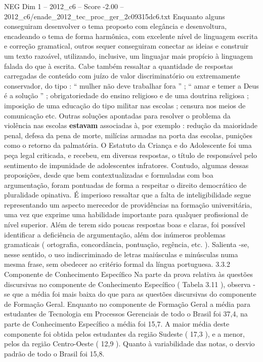 \begin{textsample}{NEG Dim 1 – 2012\_c6 – Score -2.00 – 2012\_c6/enade\_2012\_tec\_proc\_ger\_2c09315dc6.txt}
Enquanto alguns conseguiram desenvolver o tema proposto com elegância e desenvoltura, encadeando o tema de forma harmônica, com excelente nível de linguagem escrita e correção gramatical, outros sequer conseguiram conectar as ideias e construir um texto razoável, utilizando, inclusive, um linguajar mais propício à linguagem falada do que à escrita.
Cabe também ressaltar a quantidade de respostas carregadas de conteúdo com juízo de valor discriminatório ou extremamente conservador, do tipo : “ mulher não deve trabalhar fora ” ; “ amar e temer a Deus é a solução ” ; obrigatoriedade do ensino religioso e de uma doutrina religiosa ; imposição de uma educação do tipo militar nas escolas ; censura nos meios de comunicação etc.
Outras soluções apontadas para resolver o problema da violência nas escolas \textbf{estavam} associadas à, por exemplo : redução da maioridade penal, defesa da pena de morte, milícias armadas na porta das escolas, punições como o retorno da palmatória.
O Estatuto da Criança e do Adolescente foi uma peça legal criticada, e recebeu, em diversas respostas, o título de responsável pelo sentimento de impunidade de adolescentes infratores.
Contudo, algumas dessas proposições, desde que bem contextualizadas e formuladas com boa argumentação, foram pontuadas de forma a respeitar o direito democrático de pluralidade opinativa.
É imperioso ressaltar que a falta de inteligibilidade segue representando um aspecto merecedor de providências na formação universitária, uma vez que exprime uma habilidade importante para qualquer profissional de nível superior.
Além de terem sido poucas respostas boas e claras, foi possível identificar a deficiência de argumentação, além dos inúmeros problemas gramaticais ( ortografia, concordância, pontuação, regência, etc. ).
Salienta -se, nesse sentido, o uso indiscriminado de letras maiúsculas e minúsculas numa mesma frase, sem obedecer ao critério formal da língua portuguesa. 3.3.2 Componente de Conhecimento Específico Na parte da prova relativa às questões discursivas no componente de Conhecimento Específico ( Tabela 3.11 ), observa -se que a média foi mais baixa do que para as questões discursivas do componente de Formação Geral.
Enquanto no componente de Formação Geral a média para estudantes de Tecnologia em Processos Gerenciais de todo o Brasil foi 37,4, na parte de Conhecimento Específico a média foi 15,7.
A maior média deste componente foi obtida pelos estudantes da região Sudeste ( 17,3 ), e a menor, pelos da região Centro-Oeste ( 12,9 ).
Quanto à variabilidade das notas, o desvio padrão de todo o Brasil foi 15,8.

\end{textsample}
